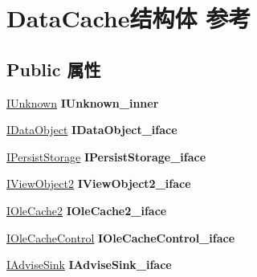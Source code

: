 \hypertarget{struct_data_cache}{}\section{Data\+Cache结构体 参考}
\label{struct_data_cache}
\subsection*{Public 属性}
\begin{DoxyCompactItemize}
\item 
\mbox{\label{struct_data_cache_a0a543f3dbbcc87423781ed464e3ab33f}} 
\hyperlink{interface_i_unknown}{I\+Unknown} {\bfseries I\+Unknown\+\_\+inner}
\item 
\mbox{\label{struct_data_cache_a752482804d314db3558526193f8379a5}} 
\hyperlink{interface_i_data_object}{I\+Data\+Object} {\bfseries I\+Data\+Object\+\_\+iface}
\item 
\mbox{\label{struct_data_cache_ad291d0e87c42ce884b3a68aaff7e4a70}} 
\hyperlink{interface_i_persist_storage}{I\+Persist\+Storage} {\bfseries I\+Persist\+Storage\+\_\+iface}
\item 
\mbox{\label{struct_data_cache_a72a58161632d43b6a9219f4219e773b5}} 
\hyperlink{interface_i_view_object2}{I\+View\+Object2} {\bfseries I\+View\+Object2\+\_\+iface}
\item 
\mbox{\label{struct_data_cache_aaa16a735c02c07afc3524df2a84df8cc}} 
\hyperlink{interface_i_ole_cache2}{I\+Ole\+Cache2} {\bfseries I\+Ole\+Cache2\+\_\+iface}
\item 
\mbox{\label{struct_data_cache_ad02f56c3c23d90b913502c0cd9c13e82}} 
\hyperlink{interface_i_ole_cache_control}{I\+Ole\+Cache\+Control} {\bfseries I\+Ole\+Cache\+Control\+\_\+iface}
\item 
\mbox{\label{struct_data_cache_a639f6aaadf5cd39e4644eec379cdb2de}} 
\hyperlink{interface_i_advise_sink}{I\+Advise\+Sink} {\bfseries I\+Advise\+Sink\+\_\+iface}
\item 
\mbox{\label{struct_data_cache_a9f169fdb00bdb901c3519e9d91b73906}} 

\end{DoxyCompactItemize}

